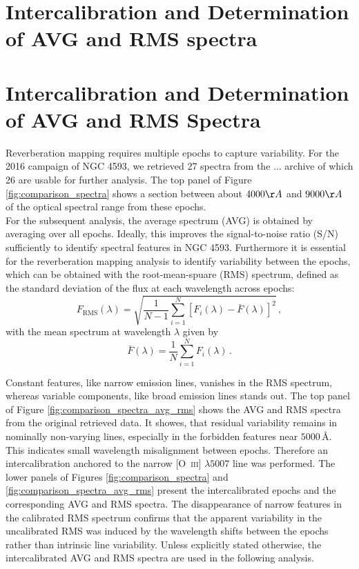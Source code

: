\newpage


\section{Intercalibration and Determination of AVG and RMS spectra}

\section{Intercalibration and Determination of AVG and RMS Spectra}

Reverberation mapping requires multiple epochs to capture variability. For the 2016 campaign of NGC 4593, we retrieved 27 spectra from the ... archive of which 26 are usable for further analysis. The top panel of Figure \ref{fig:comparison_spectra} shows a section between about $4000 \AA$ and $9000 \AA$ of the optical spectral range from these epochs.\\
For the subsequent analysis, the average spectrum (AVG) is obtained by averaging over all epochs. Ideally, this improves the signal-to-noise ratio (S/N) sufficiently to identify spectral features in NGC 4593.  Furthermore it is essential for the reverberation mapping analysis to identify variability between the epochs, which can be obtained with the root-mean-spuare (RMS) spectrum, defined as the standard deviation of the flux at each wavelength across epochs:
\begin{equation}
	F_{\mathrm{RMS}}(\lambda) = \sqrt{\frac{1}{N-1}\sum_{i=1}^{N}\left[F_i(\lambda)-\bar{F}(\lambda)\right]^2}\,,
\end{equation}
with the mean spectrum at wavelength $\lambda$ given by
\begin{equation}
	\bar{F}(\lambda) = \frac{1}{N}\sum_{i=1}^{N} F_i(\lambda)\,.
\end{equation}

Constant features, like narrow emission lines, vanishes in the RMS spectrum, whereas variable components, like broad emission lines stands out. The top panel of Figure \ref{fig:comparison_spectra_avg_rms} shows the AVG and RMS spectra from the original retrieved data. It showes, that residual variability remains in nominally non-varying lines, especially in the forbidden features near $5000\,\text{\AA}$. This indicates small wavelength misalignment between epochs. Therefore an intercalibration anchored to the narrow [O~\textsc{iii}] $\lambda5007$ line was performed. The lower panels of Figures \ref{fig:comparison_spectra} and \ref{fig:comparison_spectra_avg_rms} present the intercalibrated epochs and the corresponding AVG and RMS spectra. The disappearance of narrow features in the calibrated RMS spectrum confirms that the apparent variability in the uncalibrated RMS was induced by the wavelength shifts between the epochs rather than intrinsic line variability. Unless explicitly stated otherwise, the intercalibrated AVG and RMS spectra are used in the following analysis.

